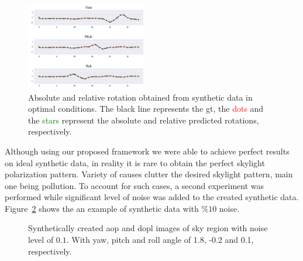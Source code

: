 \begin{figure}
  \includegraphics[width=0.47\textwidth]{./content/experiments/figures/ideal-syn-abs-rel-2.jpg}
  \caption{Absolute and relative rotation obtained from synthetic data in
    optimal conditions. The black line represents the \gls{gt}, the
    \textcolor{red}{dots} and the \textcolor{green}{stars} represent the
    absolute and relative predicted rotations, respectively.}
  \label{fig:res-syn-ideal-abs-rel}
\end{figure}

Although using our proposed framework we were able to achieve perfect results
on ideal synthetic data, in reality it is rare to obtain the perfect skylight
polarization pattern. Variety of causes clutter the desired skylight pattern,
main one being pollution. To account for such cases, a second experiment was
performed while significant level of noise was added to the created synthetic
data.
Figure~\ref{fig:aop-dop-syn-noisy} shows the an example of synthetic data with
$\%10$ noise.

\begin{figure}
  \centering
  \hfill
  \hspace*{\fill}
  \caption{Synthetically created \gls{aop} and \gls{dopl} images of sky
      region with noise level of $0.1$. With yaw, pitch and roll angle of 1.8, -0.2 and 0.1, respectively.}
  \label{fig:aop-dop-syn-noisy}
\end{figure}

